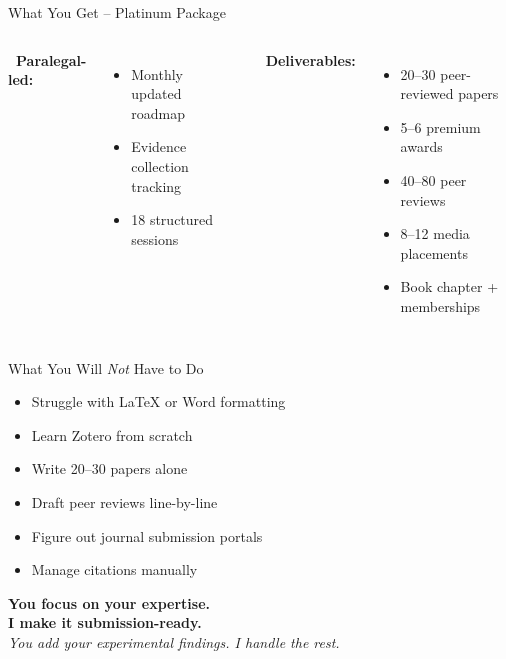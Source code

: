 \documentclass[aspectratio=169, 10pt]{beamer}
\begin{document}
	\begin{frame}{What You Get – Platinum Package}
		\begin{columns}[T]
			\textbf{\faUserGraduate \ Paralegal-led:}
			\begin{itemize}
				\item Monthly updated roadmap
				\item Evidence collection tracking
				\item 18 structured sessions
			\end{itemize}
			\textbf{\faGem \ Deliverables:}
			\begin{itemize}
				\item 20–30 peer-reviewed papers
				\item 5–6 premium awards
				\item 40–80 peer reviews
				\item 8–12 media placements
				\item Book chapter + memberships
			\end{itemize}
		\end{columns}
	\end{frame}
	
	\begin{frame}{What You Will \textit{Not} Have to Do}
		\begin{itemize}
			\item Struggle with LaTeX or Word formatting
			\item Learn Zotero from scratch
			\item Write 20–30 papers alone
			\item Draft peer reviews line-by-line
			\item Figure out journal submission portals
			\item Manage citations manually
		\end{itemize}
		
		\vspace{0.3cm}
		\centering
		\textbf{\Large You focus on your expertise.} \\
		\textbf{\Large I make it submission-ready.} \\
		\textit{You add your experimental findings. I handle the rest.}
	\end{frame}
	
\end{document}
